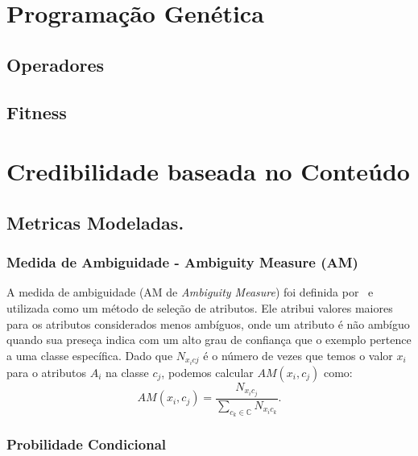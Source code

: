 
\section{Programação Genética}

\subsection{Operadores}

\subsection{Fitness}


\section{Credibilidade baseada no Conteúdo}
\label{sec::pg_cred_baseada_conteudo}

\subsection{Metricas Modeladas.}
\label{subsec::pg_metricas_conteudo}


\subsubsection{Medida de Ambiguidade - Ambiguity Measure (AM)}
\label{subsubsection::am}

A medida de ambiguidade (AM de \textit{Ambiguity Measure}) foi definida por~\cite{Mengle08} e utilizada como um método de seleção de atributos. Ele atribui valores maiores para os atributos considerados menos ambíguos, onde um atributo é não ambíguo quando sua preseça indica com um alto grau de confiança que o exemplo pertence a uma classe específica. Dado que $N_{x_{i}c{j}}$ é o número de vezes que temos o valor $x_i$ para o atributos $A_i$ na classe $c_j$, podemos calcular $AM(x_i, c_j)$ como:
\begin{equation}\label{eqn::am}
   AM(x_i, c_j) = \frac{ N_{x_{i}c_{j}}}{\sum\limits_{c_k \in \mathbb{C}} N_{x_{i}c_{k}}}.
\end{equation}

\subsubsection{Probilidade Condicional}
\label{subsubsection::pc}

